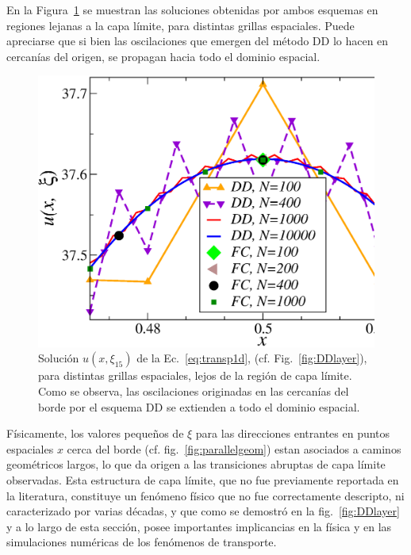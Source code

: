En la Figura~\ref{fig:DDlayer2} se muestran las soluciones obtenidas por ambos esquemas 
en regiones lejanas a la capa límite, para distintas grillas espaciales. 
Puede apreciarse que si bien las oscilaciones que emergen del método DD lo hacen 
en cercanías del origen, 
se propagan hacia todo el dominio espacial.
\begin{figure}[h!]
\centering
  \includegraphics[width=0.5\linewidth]{figuras/conv_2.eps}
  \caption{Solución $u(x,\xi_{15})$ de la Ec.~\eqref{eq:transp1d}, 
  (cf. Fig.~\ref{fig:DDlayer}), para distintas grillas espaciales, 
  lejos de la región de capa límite. 
  Como se observa, las oscilaciones originadas en 
  las cercanías del borde por el esquema DD se extienden a todo el dominio espacial.}
 \label{fig:DDlayer2}
\end{figure}

Físicamente, los valores pequeños de $\xi$ para las direcciones 
entrantes en puntos espaciales $x$ cerca del borde (cf. fig.~\ref{fig:parallelgeom}) 
estan asociados a caminos geométricos largos, lo que da origen 
a las transiciones abruptas de capa límite observadas.
Esta estructura de capa límite, que no fue previamente reportada 
en la literatura, constituye un fenómeno físico que no fue correctamente 
descripto, ni caracterizado por varias décadas, y que como se demostró 
en la fig.~\ref{fig:DDlayer} y a lo largo de esta sección, 
posee importantes implicancias en la física y en las simulaciones 
numéricas de los fenómenos de transporte.

